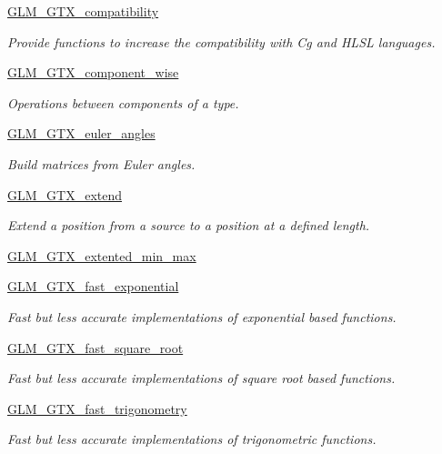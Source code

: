 \begin{DoxyCompactItemize}
\hyperlink{group__gtx__compatibility}{G\-L\-M\-\_\-\-G\-T\-X\-\_\-compatibility}
\begin{DoxyCompactList}\small\item\em Provide functions to increase the compatibility with Cg and H\-L\-S\-L languages. \end{DoxyCompactList}\item 
\hyperlink{group__gtx__component__wise}{G\-L\-M\-\_\-\-G\-T\-X\-\_\-component\-\_\-wise}
\begin{DoxyCompactList}\small\item\em Operations between components of a type. \end{DoxyCompactList}\item 
\hyperlink{group__gtx__euler__angles}{G\-L\-M\-\_\-\-G\-T\-X\-\_\-euler\-\_\-angles}
\begin{DoxyCompactList}\small\item\em Build matrices from Euler angles. \end{DoxyCompactList}\item 
\hyperlink{group__gtx__extend}{G\-L\-M\-\_\-\-G\-T\-X\-\_\-extend}
\begin{DoxyCompactList}\small\item\em Extend a position from a source to a position at a defined length. \end{DoxyCompactList}\item 
\hyperlink{group__gtx__extented__min__max}{G\-L\-M\-\_\-\-G\-T\-X\-\_\-extented\-\_\-min\-\_\-max}
\item 
\hyperlink{group__gtx__fast__exponential}{G\-L\-M\-\_\-\-G\-T\-X\-\_\-fast\-\_\-exponential}
\begin{DoxyCompactList}\small\item\em Fast but less accurate implementations of exponential based functions. \end{DoxyCompactList}\item 
\hyperlink{group__gtx__fast__square__root}{G\-L\-M\-\_\-\-G\-T\-X\-\_\-fast\-\_\-square\-\_\-root}
\begin{DoxyCompactList}\small\item\em Fast but less accurate implementations of square root based functions. \end{DoxyCompactList}\item 
\hyperlink{group__gtx__fast__trigonometry}{G\-L\-M\-\_\-\-G\-T\-X\-\_\-fast\-\_\-trigonometry}
\begin{DoxyCompactList}\small\item\em Fast but less accurate implementations of trigonometric functions. \end{DoxyCompactList}\item 

\end{DoxyCompactItemize}
